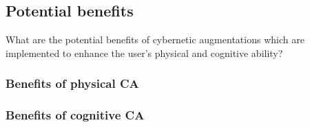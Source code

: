 \subsection{Potential benefits}
What are the potential benefits of cybernetic augmentations which are implemented to enhance the user's physical and cognitive ability?

\subsubsection{Benefits of physical CA}


\subsubsection{Benefits of cognitive CA}
